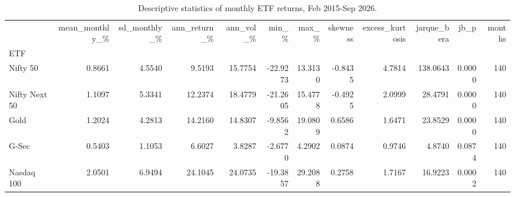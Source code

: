 \begin{table}
\caption{Descriptive statistics of monthly ETF returns, Feb 2015-Sep 2026.}
\label{tab:T02_descriptive_stats}
\begin{tabular}{lrrrrrrrrrrr}
\toprule
 & mean\_monthly\_\% & sd\_monthly\_\% & ann\_return\_\% & ann\_vol\_\% & min\_\% & max\_\% & skewness & excess\_kurtosis & jarque\_bera & jb\_p & months \\
ETF &  &  &  &  &  &  &  &  &  &  &  \\
\midrule
Nifty 50 & 0.8661 & 4.5540 & 9.5193 & 15.7754 & -22.9273 & 13.3130 & -0.8435 & 4.7814 & 138.0643 & 0.0000 & 140 \\
Nifty Next 50 & 1.1097 & 5.3341 & 12.2374 & 18.4779 & -21.2605 & 15.4778 & -0.4925 & 2.0999 & 28.4791 & 0.0000 & 140 \\
Gold & 1.2024 & 4.2813 & 14.2160 & 14.8307 & -9.8562 & 19.0809 & 0.6586 & 1.6471 & 23.8529 & 0.0000 & 140 \\
G-Sec & 0.5403 & 1.1053 & 6.6027 & 3.8287 & -2.6770 & 4.2902 & 0.0874 & 0.9746 & 4.8740 & 0.0874 & 140 \\
Nasdaq 100 & 2.0501 & 6.9494 & 24.1045 & 24.0735 & -19.3857 & 29.2088 & 0.2758 & 1.7167 & 16.9223 & 0.0002 & 140 \\
\bottomrule
\end{tabular}
\end{table}
